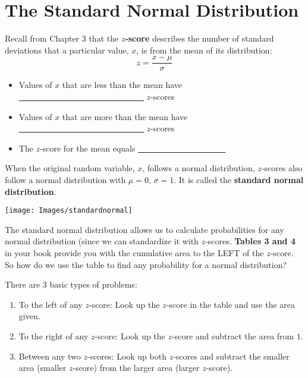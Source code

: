 \documentclass[12pt, letterpaper]{article}
\theoremstyle{definition}
\begin{document}
\newpage

\section*{The Standard Normal Distribution}


\begin{statement}
Recall from Chapter 3 that the \textbf{$z$-score} describes the number of standard deviations that a particular value, $x$, is from the mean of its distribution:
$$ z=\frac{x-\mu}{\sigma} $$
\vspace*{.1in}

\begin{itemize}

\item Values of $x$ that are less than the mean have \underline{~~~~~~~~~~~~~~~~~~~~~~~~~~~~~~} $z$-scores

\item Values of $x$ that are more than the mean have \underline{~~~~~~~~~~~~~~~~~~~~~~~~~~~~~~} $z$-scores

\item The $z$-score for the mean equals \underline{~~~~~~~~~~~~~~~~~~~~~}

\end{itemize}
\end{statement}


\begin{defn}
When the original random variable, $x$, follows a normal distribution, $z$-scores also follow a normal distribution with $\mu =0$, $\sigma=1$.  It is called the \textbf{standard normal distribution}.

\begin{center}
\texttt{[image: Images/standardnormal]}
\end{center}

\end{defn}


The standard normal distribution allows us to calculate probabilities for any normal distribution (since we can standardize it with $z$-scores.  \textbf{Tables 3 and 4} in your book provide you with the cumulative area to the LEFT of the $z$-score.  So how do we use the table to find any probability for a normal distribution?  

There are 3 basic types of problems:

\begin{enumerate}

\item To the left of any $z$-score:  Look up the $z$-score in the table and use the area given.

\item To the right of any $z$-score:  Look up the $z$-score and subtract the area from $1$.

\item Between any two $z$-scores:  Look up both $z$-scores and subtract the smaller area (smaller $z$-score) from the larger area (larger $z$-score).

\end{enumerate}
\end{document}
